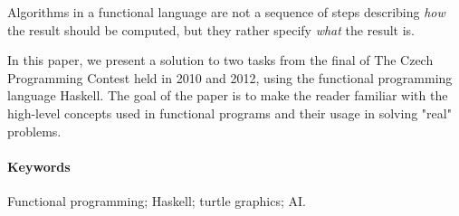 \begin{adjustwidth}{1.5cm}{1.5cm}
Algorithms in a functional language are not a sequence of steps describing
\emph{how} the result should be computed, but they rather specify \emph{what}
the result is.

In this paper, we present a solution to two tasks from the final of The Czech
Programming Contest held in 2010 and 2012, using the functional programming
language Haskell. The goal of the paper is to make the reader familiar with the
high-level concepts used in functional programs and their usage in solving
"real" problems.


\paragraph*{Keywords}
Functional programming; Haskell; turtle graphics; AI.

\end{adjustwidth}
